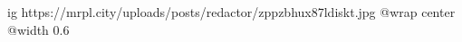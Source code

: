  
 
 
 
 

\ifcmt
  ig https://mrpl.city/uploads/posts/redactor/zppzbhux87ldiskt.jpg
  @wrap center
  @width 0.6
\fi
